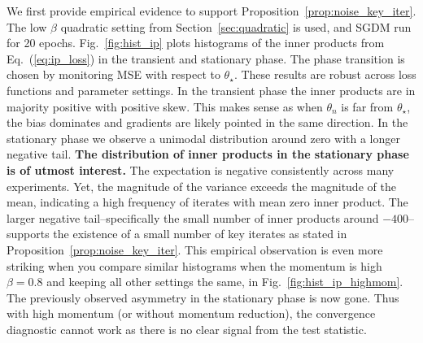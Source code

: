 \documentclass[conference]{IEEEtran}
\begin{document}
We first provide empirical evidence to support Proposition~\ref{prop:noise_key_iter}.  
The low $\beta$ quadratic setting from Section~\ref{sec:quadratic} is used, and SGDM run for 20 epochs. 
Fig.~\ref{fig:hist_ip} plots histograms of the inner products from Eq.~(\ref{eq:ip_loss}) in the transient and stationary phase. The phase transition is chosen by monitoring MSE with respect to $\theta_\star$.
These results are robust across loss functions and parameter settings. 
In the transient phase the inner products are in majority positive with positive skew. 
This makes sense as when $\theta_n$ is far from $\theta_\star$, the bias dominates and gradients are likely pointed in the same direction. 
In the stationary phase we observe a unimodal distribution around zero with a longer negative tail.
\textbf{The distribution of inner products in the stationary phase is of utmost interest.}
The expectation is negative consistently across many experiments. 
Yet, the magnitude of the variance exceeds the magnitude of the mean, indicating a high frequency of iterates with mean zero inner product.
The larger negative tail--specifically the small number of inner products around $-400$--supports the existence of a small number of key iterates as stated in Proposition~\ref{prop:noise_key_iter}.
This empirical observation is even more striking when you compare similar histograms when the momentum is high $\beta = 0.8$ and keeping all other settings the same, in Fig.~\ref{fig:hist_ip_highmom}.
The previously observed asymmetry in the stationary phase is now gone.
Thus with high momentum (or without momentum reduction), the convergence diagnostic cannot work as there is no clear signal from the test statistic.
\end{document}
